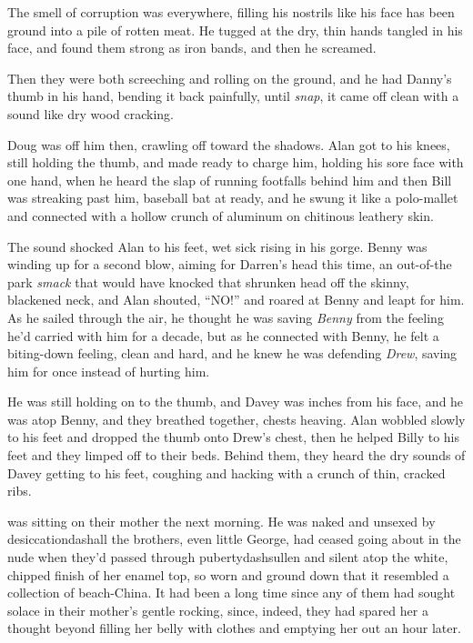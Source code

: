 The smell of corruption was everywhere, filling his nostrils like his
face has been ground into a pile of rotten meat.  He tugged at the
dry, thin hands tangled in his face, and found them strong as iron
bands, and then he screamed.

Then they were both screeching and rolling on the ground, and he had
Danny's thumb in his hand, bending it back painfully, until
\textit{snap}, it came off clean with a sound like dry wood cracking.

Doug was off him then, crawling off toward the shadows.  Alan got to
his knees, still holding the thumb, and made ready to charge him,
holding his sore face with one hand, when he heard the slap of running
footfalls behind him and then Bill was streaking past him, baseball
bat at ready, and he swung it like a polo-mallet and connected with a
hollow crunch of aluminum on chitinous leathery skin.

The sound shocked Alan to his feet, wet sick rising in his gorge. 
Benny was winding up for a second blow, aiming for Darren's head this
time, an out-of-the park \textit{smack} that would have knocked that
shrunken head off the skinny, blackened neck, and Alan shouted,
``NO!'' and roared at Benny and leapt for him.  As he sailed through
the air, he thought he was saving \textit{Benny} from the feeling he'd
carried with him for a decade, but as he connected with Benny, he felt
a biting-down feeling, clean and hard, and he knew he was defending
\textit{Drew}, saving him for once instead of hurting him.

He was still holding on to the thumb, and Davey was inches from his
face, and he was atop Benny, and they breathed together, chests
heaving.  Alan wobbled slowly to his feet and dropped the thumb onto
Drew's chest, then he helped Billy to his feet and they limped off to
their beds.  Behind them, they heard the dry sounds of Davey getting
to his feet, coughing and hacking with a crunch of thin, cracked ribs.

 was sitting on their mother the next morning.  He was naked and
unsexed by desiccationdash{}all the brothers, even little George, had
ceased going about in the nude when they'd passed through
pubertydash{}sullen and silent atop the white, chipped finish of her
enamel top, so worn and ground down that it resembled a collection of
beach-China.  It had been a long time since any of them had sought
solace in their mother's gentle rocking, since, indeed, they had
spared her a thought beyond filling her belly with clothes and
emptying her out an hour later.

